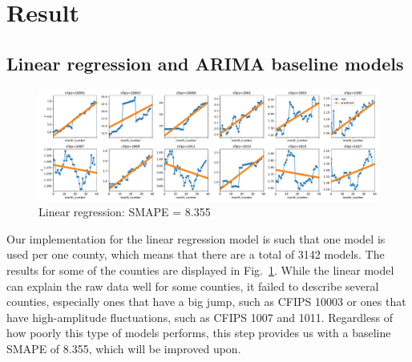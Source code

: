 \documentclass[prl,aps,superscriptaddress,twocolumn,10pt,nolongbibliography]{revtex4-2}
\begin{document}

\section{Result}

\subsection{Linear regression and ARIMA baseline models}
\begin{figure}
\includegraphics[width=7in]{figs/linear.pdf}
\caption{\label{fig:linear}
Linear regression: SMAPE = 8.355
}
\end{figure}

Our implementation for the linear regression model is such that one model is used per one county, which means that there are a total of 3142 models. 
The results for some of the counties are displayed in Fig.~\ref{fig:linear}.
While the linear model can explain the raw data well for some counties, it failed to describe several counties, especially ones that have a big jump, such as CFIPS 10003 or ones that have high-amplitude fluctuations, such as CFIPS 1007 and 1011. 
Regardless of how poorly this type of models performs, this step provides us with a baseline SMAPE of 8.355, which will be improved upon.
\end{document}
